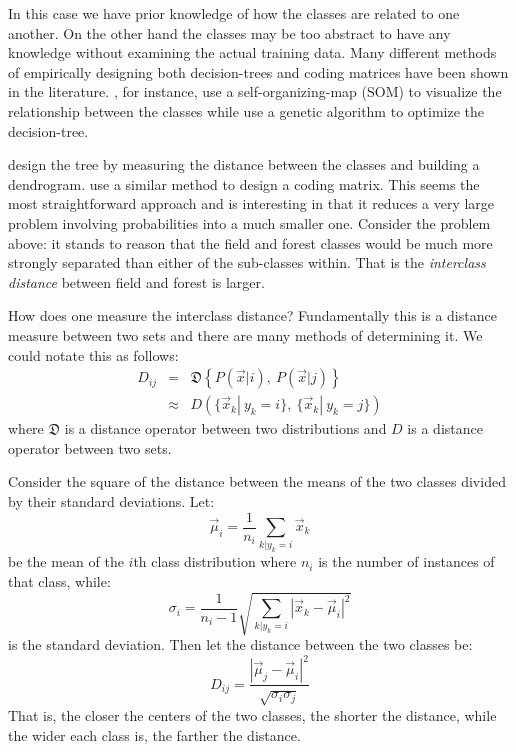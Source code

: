 \documentclass{article}
\newenvironment{eqnnon}{\begin{equation*}}{\end{equation*}}
\newenvironment{eqnarraynon}{\begin{eqnarray*}}{\end{eqnarray*}}
\begin{document}
In this case we have prior knowledge of how the classes are related to one another.
On the other hand the classes may be too abstract to have any knowledge without examining the actual training data.
Many different methods of empirically designing both decision-trees and coding matrices have been shown in the literature.
\citet{Cheong_etal2004}, for instance, use a self-organizing-map (SOM)
\citep{Kohonen2000} to visualize the relationship between the classes while
\citet{Lee_Oh2003} use a genetic algorithm to optimize the decision-tree.

\citet{Benabdeslem_Bennani2006} design the tree by measuring the distance between
the classes and building a dendrogram.
\citet{Zhou_etal2008} use a similar method to design a coding matrix.
This seems the most straightforward approach and is interesting in that it reduces a very large problem involving probabilities into a much smaller one.
Consider the problem above: it stands to reason that the field and forest classes would be much more strongly separated than either of the sub-classes within.
That is the {\it interclass distance} between field and forest is larger.

How does one measure the interclass distance? Fundamentally this is a distance measure between two sets and there are many methods of determining it.
We could notate this as follows:
\begin{eqnarraynon}
	D_{ij} & = & \mathfrak D \left \lbrace P(\vec x|i),~P(\vec x|j) \right \rbrace \\
	       & \approx & D\left (\lbrace \vec x_k|~y_k=i \rbrace,~\lbrace \vec x_k|~y_k=j\rbrace \right )
\end{eqnarraynon}
where $\mathfrak D$ is a distance operator between two distributions and $D$ is a distance operator between two sets.

Consider the square of the distance between the means of the two classes divided by their standard deviations. Let:
\begin{eqnnon}
	\vec \mu_i = \frac{1}{n_i} \sum_{k|y_k=i} \vec x_k
\end{eqnnon}
be the mean of the $i$th class distribution where $n_i$ is the number of instances of that class, while:
\begin{eqnnon}
	\sigma_i = \frac{1}{n_i-1}\sqrt{\sum_{k|y_k=i}|\vec x_k - \vec \mu_i|^2}
\end{eqnnon}
is the standard deviation.
Then let the distance between the two classes be:
\begin{eqnnon}
	D_{ij}=\frac{|\vec \mu_j - \vec \mu_i |^2}{\sqrt{\sigma_i \sigma_j}}
\end{eqnnon}
That is, the closer the centers of the two classes, the shorter the distance, while the wider each class is, the farther the distance.
	
\end{document}
